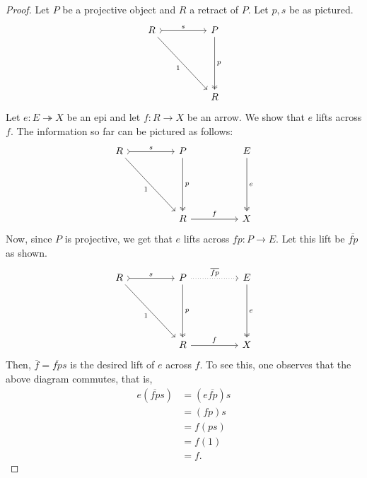 \documentclass[11pt,leqno,landscape,semhelv]{seminar}
\numberwithin{equation}{section}
\theoremstyle{definition}
\numberwithin{thm}{section}
\numberwithin{equation}{section}
\newcommand{\epi}{\twoheadrightarrow}
\begin{document}
\begin{proof} 
	Let $P$ be a projective object and $R$ a retract of $P.$ Let $p, s$ be as pictured.
	\begin{equation*} 
		\begin{tikzcd}
		R \arrow[rr, "s", tail] \arrow[rrddd, "1"'] &  & P \arrow[ddd, "p", two heads] \\&&\\&&\\&&R                            
		\end{tikzcd}
	\end{equation*}
	Let $e: E \epi X$ be an epi and let $f:R\to X$ be an arrow. We show that $e$ lifts across $f.$ The information so far can be pictured as follows:
	\begin{equation*} 
		\begin{tikzcd}
			R \arrow[rr, "s", tail] \arrow[rrddd, "1"'] &%
			& P \arrow[ddd, "p", two heads] &  & E \arrow[ddd, "e", two heads] \\
			&&&&\\&&&&\\&&R \arrow[rr, "f"]&&X
		\end{tikzcd}	
	\end{equation*}
	Now, since $P$ is projective, we get that $e$ lifts across $fp:P\to E.$ Let this lift be $\overline{fp}$ as shown.
	\begin{equation*} 
		\begin{tikzcd}
			R \arrow[rr, "s", tail] \arrow[rrddd, "1"'] &%
			& P \arrow[ddd, "p", two heads] \arrow[rr, "\overline{fp}", dotted]  &  & E \arrow[ddd, "e", two heads] \\
			&&&&\\&&&&\\&&R \arrow[rr, "f"]&&X
		\end{tikzcd}	
	\end{equation*}
	Then, $\bar{f} = \overline{fp}s$ is the desired lift of $e$ across $f.$ To see this, one observes that the above diagram commutes, that is,
	\begin{align*} 
		e(\overline{fp}s) &= (e \overline{fp})s\\
		&= (fp)s\\
		&= f(ps)\\
		&= f(1)\\
		&= f.
	\end{align*}
\end{proof}
%
%
\end{document}
